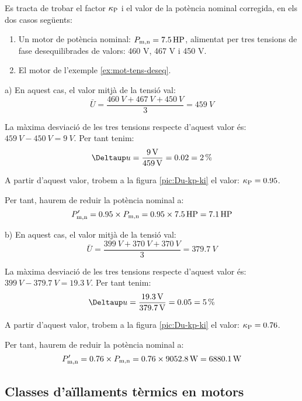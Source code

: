 \begin{exemple}\label{ex:NEMA-tens-deseq}
Es tracta de trobar el factor $\kappa_\mathrm{P}$  i el valor de la potència nominal corregida, en els dos casos següents:	
    \begin{enumerate}
		\renewcommand{\labelenumi}{\alph{enumi})}
		\item Un motor de  potència nominal: $P_\mathrm{m,n} = \qty{7,5}{HP}$, alimentat per tres tensions de fase desequilibrades   de valors: 460 V, 467 V i 450 V.
		
		\item El motor de l'exemple \vref{ex:mot-tens-deseq}.
	\end{enumerate}
	
	a)  En aquest cas, el valor mitjà de la tensió val:
    \[
      \bar{U} = \frac{\qty{460}{V}+\qty{467}{V}+\qty{450}{V}}{3} = \qty{459}{V}
    \]

    La màxima desviació de les tres tensions respecte d'aquest valor és: $\qty{459}{V}-\qty{450}{V} = \qty{9}{V}$. Per tant tenim:
    \[
        \Deltaup u = \frac{\qty{9}{V}}{\qty{459}{V}} = \num{0,02} = \qty{2}{\%}
    \]

     A partir d'aquest valor, trobem a la figura \vref{pic:Du-kp-ki} el valor:  $\kappa_\mathrm{P} = \num{0,95}$.

     Per tant, haurem de reduir la potència nominal a:
     \[
         P'_\mathrm{m,n} = \num{0,95}\times{}P_\mathrm{m,n}  = \num{0,95}\times\qty{7,5}{HP} = \qty{7,1}{HP}
     \]
     
	 b)  En aquest cas, el valor mitjà de la tensió val:
	 \[
	 \bar{U} = \frac{\qty{399}{V}+\qty{370}{V}+\qty{370}{V}}{3} = \qty{379,7}{V}
	 \]
	 
	 La màxima desviació de les tres tensions respecte d'aquest valor és: $\qty{399}{V}-\qty{379,7}{V} = \qty{19,3}{V}$. Per tant tenim:
	 \[
	 \Deltaup u = \frac{\qty{19,3}{V}}{\qty{379,7}{V}} = \num{0,05} = \qty{5}{\%}
	 \]
	 
	 A partir d'aquest valor, trobem a la figura \ref{pic:Du-kp-ki} el valor:  $\kappa_\mathrm{P} = \num{0,76}$.    
     
     Per tant, haurem de reduir la potència nominal a:
     \[
     P'_\mathrm{m,n} = \num{0,76}\times{}P_\mathrm{m,n}  = \num{0,76}\times\qty{9052,8}{W} = \qty{6880,1}{W}
     \]
\end{exemple}

\subsection{Classes d'aïllaments tèrmics en motors}


